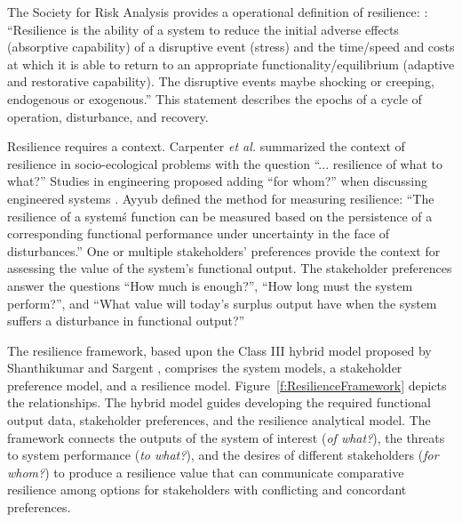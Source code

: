 \documentclass[preprint,12pt]{elsarticle}
\begin{document}
The Society for Risk Analysis provides a operational definition of
resilience: \cite{SRA2016}: ``Resilience is the ability of a system to
reduce the initial adverse effects (absorptive capability) of a
disruptive event (stress) and the time/speed and costs at which it
is able to return to an appropriate functionality/equilibrium
(adaptive and restorative capability). The disruptive events maybe
shocking or creeping, endogenous or exogenous.'' This statement
describes the epochs of a cycle of operation, disturbance, and
recovery.


Resilience requires a context. Carpenter \emph{et al.}
\cite{Carpenter2001} summarized the context of resilience in
socio-ecological problems with the question ``... resilience of what
to what?''  Studies in engineering proposed adding ``for whom?'' when
discussing engineered systems \cite{Emanuel2017,Emanuel2018}. 
Ayyub \cite{Ayyub2014a} defined the method for measuring
resilience: ``The resilience of a system\'s function can be measured
based on the persistence of a corresponding functional performance
under uncertainty in the face of disturbances.'' One or multiple
stakeholders' preferences provide the context for assessing the value
of the system's functional output. The stakeholder preferences answer
the questions ``How much is enough?'', ``How long must the system
perform?'', and ``What value will today's surplus output have when the
system suffers a disturbance in functional output?''
\cite{Emanuel2017,Emanuel2018} 

The resilience framework, based upon the Class III hybrid model
proposed by Shanthikumar and Sargent \cite{Shanthikumar1983},
comprises the system models, a stakeholder preference model, and a resilience
model. Figure~\ref{f:ResilienceFramework} depicts the
relationships. The hybrid model guides
developing the required functional output data, stakeholder
preferences, and the resilience analytical model. The framework connects  the
outputs of the system of interest (\emph{of what?}), the threats to system
performance (\emph{to what?}),
and the desires of different stakeholders (\emph{for whom?}) to produce a resilience
value that can communicate comparative resilience among options for
 stakeholders with conflicting and concordant preferences.
\end{document}
